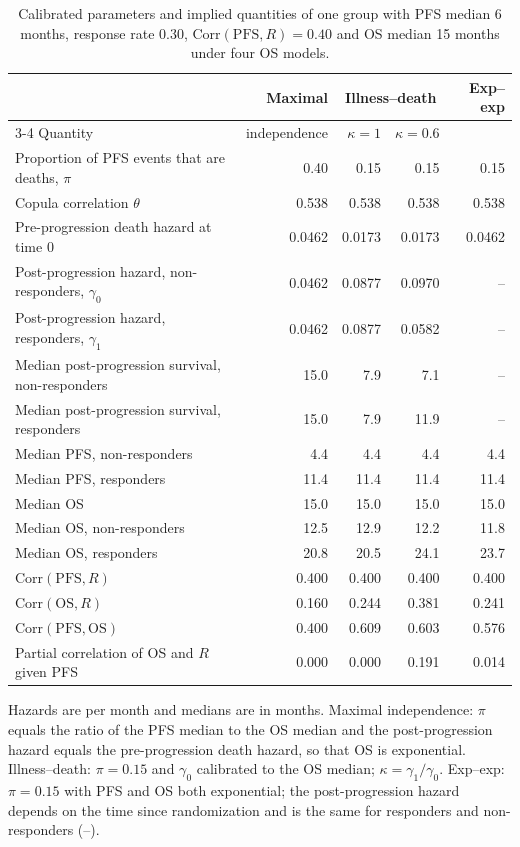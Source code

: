 \begin{table}[htbp]
\centering
\caption{Calibrated parameters and implied quantities of one group with PFS median 6 months, response rate 0.30, $\mathrm{Corr}(\mathrm{PFS}, R) = 0.40$ and OS median 15 months under four OS models.}
\label{tab:calibration}
\begin{threeparttable}
\small
\begin{tabular}{p{5.2cm}rrrr}
\toprule
 & Maximal & \multicolumn{2}{c}{Illness--death} & Exp--exp \\
\cmidrule(lr){3-4}
Quantity & independence & $\kappa = 1$ & $\kappa = 0.6$ & \\
\midrule
Proportion of PFS events that are deaths, $\pi$ & 0.40 & 0.15 & 0.15 & 0.15 \\
Copula correlation $\theta$ & 0.538 & 0.538 & 0.538 & 0.538 \\
Pre-progression death hazard at time 0 & 0.0462 & 0.0173 & 0.0173 & 0.0462 \\
Post-progression hazard, non-responders, $\gamma_0$ & 0.0462 & 0.0877 & 0.0970 & -- \\
Post-progression hazard, responders, $\gamma_1$ & 0.0462 & 0.0877 & 0.0582 & -- \\
Median post-progression survival, non-responders & 15.0 & 7.9 & 7.1 & -- \\
Median post-progression survival, responders & 15.0 & 7.9 & 11.9 & -- \\
Median PFS, non-responders & 4.4 & 4.4 & 4.4 & 4.4 \\
Median PFS, responders & 11.4 & 11.4 & 11.4 & 11.4 \\
Median OS & 15.0 & 15.0 & 15.0 & 15.0 \\
Median OS, non-responders & 12.5 & 12.9 & 12.2 & 11.8 \\
Median OS, responders & 20.8 & 20.5 & 24.1 & 23.7 \\
$\mathrm{Corr}(\mathrm{PFS}, R)$ & 0.400 & 0.400 & 0.400 & 0.400 \\
$\mathrm{Corr}(\mathrm{OS}, R)$ & 0.160 & 0.244 & 0.381 & 0.241 \\
$\mathrm{Corr}(\mathrm{PFS}, \mathrm{OS})$ & 0.400 & 0.609 & 0.603 & 0.576 \\
Partial correlation of OS and $R$ given PFS & 0.000 & 0.000 & 0.191 & 0.014 \\
\bottomrule
\end{tabular}
\begin{tablenotes}
\footnotesize
\item Hazards are per month and medians are in months. Maximal independence: $\pi$ equals the ratio of the PFS median to the OS median and the post-progression hazard equals the pre-progression death hazard, so that OS is exponential. Illness--death: $\pi = 0.15$ and $\gamma_0$ calibrated to the OS median; $\kappa = \gamma_1 / \gamma_0$. Exp--exp: $\pi = 0.15$ with PFS and OS both exponential; the post-progression hazard depends on the time since randomization and is the same for responders and non-responders (--).
\end{tablenotes}
\end{threeparttable}
\end{table}
